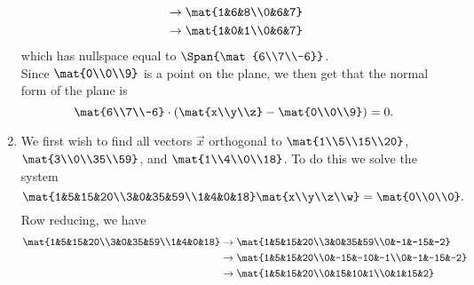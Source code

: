 \begin{exercises}
\begin{problist}
\begin{solution}
\begin{enumerate}
\begin{align*}
					&\rightarrow \mat{1&6&8\\0&6&7}\\
					&\rightarrow \mat{1&0&1\\0&6&7}\\
				\end{align*}
				which has nullspace equal to $\Span{\mat{6\\7\\-6}}$.\\
				Since $\mat{0\\0\\9}$ is a point on the plane, we then get that the normal form of the plane is \[\mat{6\\7\\-6}\cdot \left(\mat{x\\y\\z}-\mat{0\\0\\9}\right)=0.\]
				\item We first wish to find all vectors $\vec x$ orthogonal to $\mat{1\\5\\15\\20}$, $\mat{3\\0\\35\\59}$, and $\mat{1\\4\\0\\18}$. 
					To do this we solve the system \[\mat{1&5&15&20\\3&0&35&59\\1&4&0&18}\mat{x\\y\\z\\w}=\mat{0\\0\\0}.\] Row reducing, we have 
				\begin{align*}
					\mat{1&5&15&20\\3&0&35&59\\1&4&0&18}&\rightarrow \mat{1&5&15&20\\3&0&35&59\\0&-1&-15&-2}\\
					&\rightarrow \mat{1&5&15&20\\0&-15&-10&-1\\0&-1&-15&-2}\\
					&\rightarrow \mat{1&5&15&20\\0&15&10&1\\0&1&15&2}\\

\end{align*}
\end{enumerate}
\end{solution}
\end{problist}
\end{exercises}
